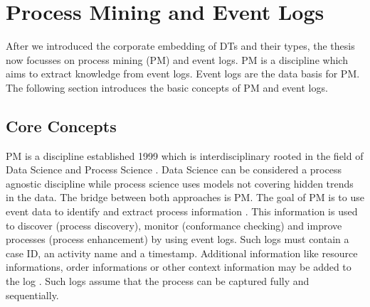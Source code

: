 \section{Process Mining and Event Logs}
\label{sec:process-mining}
After we introduced the corporate embedding of DTs and their types, the thesis now focusses on process mining (PM) and event logs. PM is a discipline which aims to extract knowledge from event logs. Event logs are the data basis for PM. The following section introduces the basic concepts of PM and event logs.

\subsection{Core Concepts}
\label{sec:core-concepts}
PM is a discipline established 1999 which is interdisciplinary rooted in the field of Data Science and Process Science \autocite{van2016data}. Data Science can be considered a process agnostic discipline \autocite{van2016data} while process science uses models not covering hidden trends in the data. The bridge between both approaches is PM. The goal of PM is to use event data to identify and extract process information \autocite{vanderAalst2012}. This information is used to discover (process discovery), monitor (conformance checking) and improve processes (process enhancement) \autocite{vanderAalst2012} by using event logs. Such logs must contain a case ID, an activity name and a timestamp. Additional information like resource informations, order informations or other context information may be added to the log \autocite{vanderAalst2012}. Such logs assume that the process can be captured fully and sequentially.

